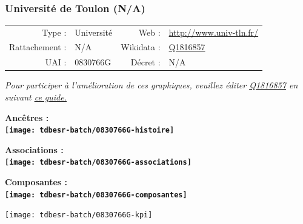 \documentclass[12pt,french,]{article}
\begin{document}
\ifoddpage ~\newpage \fi   

\hypertarget{universituxe9-de-toulon-na}{%
\subsubsection{Université de Toulon
(N/A)}\label{universituxe9-de-toulon-na}}

\begin{tabular*}{\textwidth}{rp{5cm}rl}  
\hline  
Type : & Université & Web : &\href{http://www.univ-tln.fr/}{http://www.univ-tln.fr/} \\  
Rattachement : & N/A & Wikidata : & \href{https://www.wikidata.org/entity/Q1816857}{Q1816857} \\  
UAI : & 0830766G & Décret : & N/A \\  
\hline  
\end{tabular*}

\textit{\scriptsize Pour participer à l'amélioration de ces graphiques, veuillez éditer  \href{https://www.wikidata.org/entity/Q1816857}{Q1816857}  en suivant \href{https://github.com/cpesr/wikidataESR/blob/master/Rmd/wikidataESR.md}{ce guide.}}

\vspace{1cm}  
\begin{minipage}[b]{0.50\textwidth}\begin{center} \bf Ancêtres : \\  
\texttt{[image: tdbesr-batch/0830766G-histoire]} \end{center}\end{minipage}\begin{minipage}[b]{0.50\textwidth}\begin{center} \bf Associations : \\  
\texttt{[image: tdbesr-batch/0830766G-associations]} \end{center}\end{minipage}

\hrulefill

\begin{center} \bf Composantes : \\  
\texttt{[image: tdbesr-batch/0830766G-composantes]} \end{center}

\begin{center}\texttt{[image: tdbesr-batch/0830766G-kpi]} \end{center}\checkoddpage

\ifoddpage ~\newpage \fi   
\end{document}

